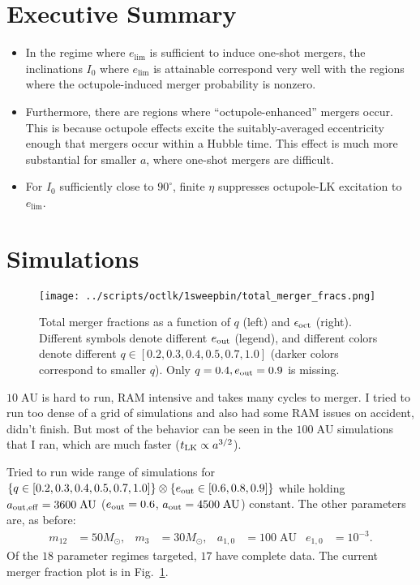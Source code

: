 \documentclass[11pt,
        usenames, %
        dvipsnames %
    ]{article}
\newcommand*{\z}[1]{\left\{#1\right\}}
\begin{document}
\section{Executive Summary}

\begin{itemize}
    \item In the regime where $e_{\lim}$ is sufficient to induce one-shot
        mergers, the inclinations $I_0$ where $e_{\lim}$ is attainable
        correspond very well with the regions where the octupole-induced merger
        probability is nonzero.

    \item Furthermore, there are regions where ``octupole-enhanced'' mergers
        occur. This is because octupole effects excite the suitably-averaged
        eccentricity enough that mergers occur within a Hubble time. This effect
        is much more substantial for smaller $a$, where one-shot mergers are
        difficult.

    \item For $I_0$ sufficiently close to $90^\circ$, finite $\eta$ suppresses
        octupole-LK excitation to $e_{\lim}$.
\end{itemize}

\section{Simulations}

\begin{figure}[h]
    \centering
    \texttt{[image: ../scripts/octlk/1sweepbin/total\_merger\_fracs.png]}
    \caption{Total merger fractions as a function of $q$ (left) and
    $\epsilon_{\rm oct}$ (right). Different symbols denote different $e_{\rm
    out}$ (legend), and different colors denote different $q \in [0.2, 0.3, 0.4,
    0.5, 0.7, 1.0]$ (darker colors correspond to smaller $q$). Only $q = 0.4,
    e_{\rm out} = 0.9$ is missing.}\label{fig:merger_fracs}
\end{figure}

$10\;\mathrm{AU}$ is hard to run, RAM intensive and takes many cycles to merger.
I tried to run too dense of a grid of simulations and also had some RAM issues
on accident, didn't finish. But most of the behavior can be seen in the
$100\;\mathrm{AU}$ simulations that I ran, which are much faster ($t_{\rm LK}
\propto a^{3/2}$).

Tried to run wide range of simulations for $\z{q \in [0.2, 0.3, 0.4, 0.5, 0.7,
1.0]} \otimes \z{e_{\rm out} \in [0.6, 0.8, 0.9]}$ while holding $a_{\rm out,
eff} = 3600\;\mathrm{AU}$ ($e_{\rm out} = 0.6$, $a_{\rm out} =
4500\;\mathrm{AU}$) constant. The other parameters are, as before:
\begin{align*}
    m_{12} &= 50M_{\odot}, &
    m_3 &= 30 M_{\odot}, &
    a_{1,0} &= 100\;\mathrm{AU}&
    e_{1, 0} &= 10^{-3}.
\end{align*}
Of the $18$ parameter regimes targeted, $17$ have complete data. The current
merger fraction plot is in Fig.~\ref{fig:merger_fracs}.
\end{document}
